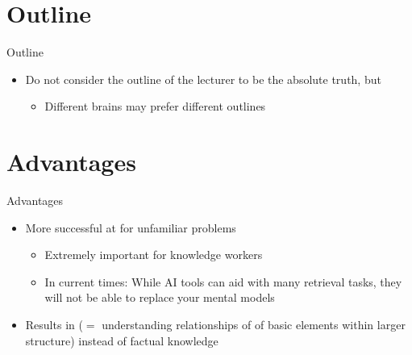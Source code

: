 \documentclass{ercisbeamer}
\begin{document}
\section{Outline}
\begin{frame}{Outline}
    \begin{tbox}
        \begin{itemize}
            \item Do not consider the outline of the lecturer to be the absolute truth, but 
            \begin{itemize}
                \item Different brains may prefer different outlines
            \end{itemize}
        \end{itemize}
    \end{tbox}
\end{frame}
\setbgimage{}

\section{Advantages}
\begin{frame}{Advantages}
    \begin{itemize}
        \item More successful at  for unfamiliar problems
        \begin{itemize}
            \item Extremely important for knowledge workers
            \item In current times: While AI tools  can aid with many retrieval tasks, they will not be able to replace your mental models 
        \end{itemize}
        \item Results in  ($=$ understanding relationships of of basic elements within larger structure) instead of factual knowledge
    \end{itemize}
\end{frame}

\end{document}
